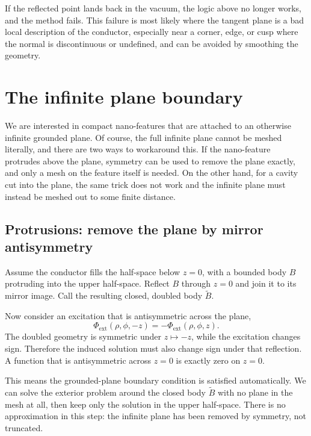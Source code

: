 \documentclass[11pt]{article}
\begin{document}
If the reflected point lands back in the vacuum, the logic above no longer
works, and the method fails.  This failure is most likely where the tangent plane is a bad local description
of the conductor, especially near a corner, edge, or cusp where the normal is
discontinuous or undefined, and can be avoided by smoothing the geometry.

\section{The infinite plane boundary}

We are interested in compact nano-features that are attached to an
otherwise infinite grounded plane.  Of course, the full infinite plane cannot be meshed
literally, and there are two ways to workaround this.  If the nano-feature protrudes above the plane, symmetry can be used to remove the plane exactly, and only a mesh on the feature itself is needed.  On the other hand, for a cavity cut into the plane, the same trick does not work and the infinite plane must instead be meshed out to some finite distance.

\subsection{Protrusions: remove the plane by mirror antisymmetry}

Assume the conductor fills the half-space below $z=0$, with a bounded body $B$
protruding into the upper half-space.  Reflect $B$ through $z=0$ and join it to
its mirror image.  Call the resulting closed, doubled body $\widetilde{B}$.

Now consider an excitation that is antisymmetric across the plane,
\begin{equation}
  \Phi_{\mathrm{ext}}(\rho,\phi,-z)
  = -\Phi_{\mathrm{ext}}(\rho,\phi,z).
  \label{eq:antisym}
\end{equation}
The doubled geometry is symmetric under $z\mapsto-z$, while the excitation
changes sign.  Therefore the induced solution must also change sign under that
reflection.  A function that is antisymmetric across $z=0$ is exactly zero on
$z=0$.

This means the grounded-plane boundary condition is satisfied automatically.
We can solve the exterior problem around the closed body $\widetilde{B}$ with no
plane in the mesh at all, then keep only the solution in the upper half-space.
There is no approximation in this step: the infinite plane has been removed by
symmetry, not truncated.
\end{document}
